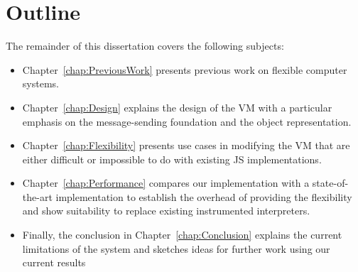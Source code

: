 %
%
%

\section{Outline}

The remainder of this dissertation covers the following subjects: 
\begin{itemize}
    \item Chapter~\ref{chap:PreviousWork} presents previous work on flexible computer systems.
    \item Chapter~\ref{chap:Design} explains the design of the VM with a
        particular emphasis on the message-sending foundation and the object
        representation.
    \item Chapter~\ref{chap:Flexibility} presents use cases in modifying the VM
        that are either difficult or impossible to do with existing JS
        implementations.
    \item Chapter~\ref{chap:Performance} compares our implementation with a
        state-of-the-art implementation to establish the overhead of providing
        the flexibility and show suitability to replace existing instrumented
        interpreters.
    \item Finally, the conclusion in Chapter~\ref{chap:Conclusion} explains the
        current limitations of the system and sketches ideas for further work
        using our current results
\end{itemize}
